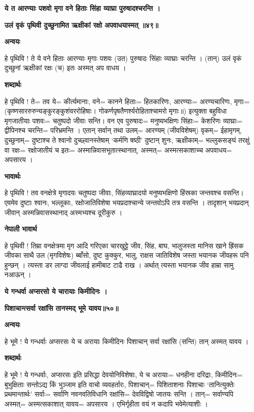 \documentclass[11pt, a5paper]{article}
\begin{document}
\textbf{ये त आरण्याः पशवो मृगा वने हिताः सिंहा व्याघ्रा पुरुषादश्चरन्ति ।}

\textbf{उलं वृकं पृथिवी दुच्छुनामित ऋक्षीकां रक्षो अपवाधयास्मत् ॥४९॥}

\textbf{अन्वयः}

ह‍े पृथिवि ! ते ये वने हिताः आरण्याः मृगाः पशवः (उत) पुरुषादः सिंहाः व्याघ्राः चरन्ति । (तान्) उलं वृकं दुच्छुनां ऋक्षीकां रक्षः (च) इतः अस्मत् अप वाधय ।

\textbf{शब्दार्थः}

हे पृथिवि ! ते= तव ये= कीर्त्यमानाः, वने= कानने हिताः= हितकारिणः, आरण्याः= अरण्यचारिणः, मृगाः= (कृष्णसाररुरुन्यङ्‍कुरङ्‍कुशंवररोहिषाः। गोकर्णपृषतैणर्श्यरोहिताश्चामरो मृगाः॥) इत्युक्ता बहुविधा मृगजातीयाः पशवः= चतुष्पदो जीवाः सन्ति। वन एव पुरुषादः= मनुष्यभक्षिणः सिंहाः= केशरिणः व्याघ्राः= द्वीपिनश्च चरन्ति= परिभ्रमन्ति । एतान् सर्वान् तथा उलम्= आरण्यम् (जीवविशेषम्) वृकम्= ईहामृगम्, दुच्छुनाम्= दुष्टाश्च ते श्वानो दुच्छ्वानस्तेषाम् ‘कर्मणि षष्ठी’ दुष्टान् शुनः, ऋक्षीकाम्= भल्‍लुकसङ‍्घं तरक्षुं वा रक्षः= रक्षोजातीयं च इतः= अस्मान्निवासभूतात्स्थानात्, अस्मत्= अस्मत्सकाशाच्च अपवाधय= अपसारय ।

\textbf{भावार्थः}

हे पृथिवि ! तव वनक्षेत्रे मृगादयः चतुष्पदा जीवाः, सिंहव्याघ्रादयो मनुष्यभक्षिणो हिंस्रका जन्तवश्च वसन्ति। एवमेव दुष्टाः श्वानः, भल्लूकाः, रक्षोजातिविशेषा भयप्रदाश्चान्ये जन्तवोऽपि तत्र वसन्ति । तादृशान् भयप्रदान् जीवान् अस्मन्निवासस्थानाद् अस्मभ्यश्च दूरीकुरु ।

\textbf{नेपाली भावार्थ}

हे पृथिवी ! तिम्रा वनक्षेत्रमा मृग आदि गरिएका चारखुट्टे जीव, सिंह, बाघ, भालुजस्ता मानिस खाने ह्रिंसक जीवका साथै उल (मृगविशेषः) ब्बाँसो, दुष्ट कुक्कुर, भालु, राक्षस जातिविशेष जस्ता भयानक जीवहरू पनि हुन्छन् । त्यस्ता डर लाग्दा जीवलाई हामीबाट टाढै राख । अर्थात् त्यस्ता भयानक जीव हाम्रा सामु नआऊन् ।

\textbf{ये गन्धर्वा अप्सरसो ये चारायाः किमीदिनः ।}

\textbf{पिशाचान्त्सर्वा रक्षांसि तानस्मद् भूमे यावय॥५०॥}

\textbf{अन्वयः}

हे भूमे ! ये गन्धर्वाः अप्सरसः ये च अरायाः किमीदिनः पिशाचान् सर्वा रक्षांसि (सन्ति) तान् अस्मत् यावय ।

\textbf{शब्दार्थः}

हे भूमे ! ये गन्धर्वाः, अप्सरसः इति प्रसिद्धा देवयोनिविशेषाः, ये च अरायाः= धनहीना दरिद्राः, किमीदिनः= बुभुक्षिताः सन्तोऽद्य किं भुञ्जाम इति वाचो व्यवहर्तारः, पिशाचान्= पिशिताशनाः पिशाचाः ‘तानित्युक्तेः प्रथमान्तार्थः’ सर्वाः= सर्वाणि नवनवतिविधानि रक्षांसि= देवविद्विषो जातयः सन्ति । तान्= सर्वाण्यपि अस्मत्= अस्मत्सकाशात् यावय= अपसारय । एभिर्गृहीता वयं न कदापि भवेमेत्याशीः ।
\end{document}
